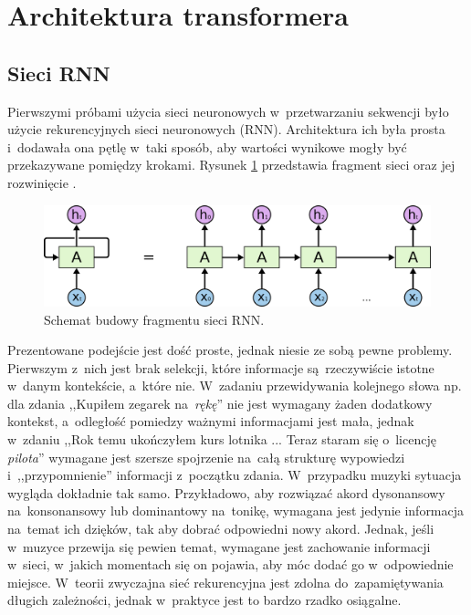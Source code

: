 \documentclass[data-science]{agh-wi} %
\begin{document}
\section{Architektura transformera}
\subsection{Sieci RNN}
Pierwszymi próbami użycia sieci neuronowych w~przetwarzaniu sekwencji było użycie rekurencyjnych sieci neuronowych (RNN). Architektura ich była prosta i~dodawała ona pętlę w~taki sposób, aby wartości wynikowe mogły być przekazywane pomiędzy krokami. Rysunek \ref*{fig:rnn_scheme} przedstawia fragment sieci oraz jej rozwinięcie \cite{Understanding_lstm}.
\begin{figure}[ht!]
    \begin{center}
        \includegraphics[width=0.7\linewidth]{./img/rnn_scheme.png}
    \end{center}
    \caption{Schemat budowy fragmentu sieci RNN.}\label{fig:rnn_scheme}
\end{figure}

Prezentowane podejście jest dość proste, jednak niesie ze sobą pewne problemy. Pierwszym z~nich jest brak selekcji, które informacje są~rzeczywiście istotne w~danym kontekście, a~które nie. W~zadaniu przewidywania kolejnego słowa np. dla zdania ,,Kupiłem zegarek na~\textit{rękę}'' nie jest wymagany żaden dodatkowy kontekst, a~odległość pomiedzy ważnymi informacjami jest mała, jednak w~zdaniu ,,Rok temu ukończyłem kurs lotnika ... Teraz staram się o~licencję \textit{pilota}'' wymagane jest szersze spojrzenie na~całą strukturę wypowiedzi i~,,przypomnienie'' informacji z~początku zdania. W~przypadku muzyki sytuacja wygląda dokładnie tak samo. Przykładowo, aby rozwiązać akord dysonansowy na~konsonansowy lub dominantowy na~tonikę, wymagana jest jedynie informacja na~temat ich dzięków, tak aby dobrać odpowiedni nowy akord. Jednak, jeśli w~muzyce przewija się pewien temat, wymagane jest zachowanie informacji w~sieci, w~jakich momentach się on pojawia, aby móc dodać go w~odpowiednie miejsce. W~teorii zwyczajna sieć rekurencyjna jest zdolna do~zapamiętywania długich zależności, jednak w~praktyce jest to bardzo rzadko osiągalne.
\end{document}

